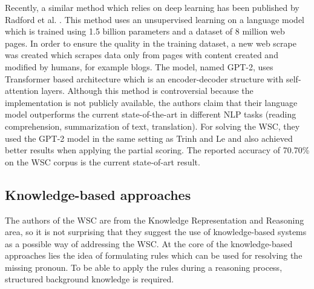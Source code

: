 Recently, a similar method which relies on deep learning has been published by Radford et al. \cite{radford2019language}. This method uses an unsupervised learning on a language model which is trained using 1.5 billion parameters and a dataset of 8 million web pages. In order to ensure the quality in the training dataset, a new web scrape was created which scrapes data only from pages with content created and modified by humans, for example blogs. The model, named GPT-2, uses Transformer based architecture \cite{DBLP:conf/nips/VaswaniSPUJGKP17} which is an encoder-decoder structure with self-attention layers. 
Although this method is controversial because the implementation is not publicly available, the authors claim that their language model outperforms the current state-of-the-art in different NLP tasks (reading comprehension, summarization of text, translation). For solving the WSC, they used the GPT-2 model in the same setting as Trinh and Le \cite{DBLP:journals/corr/abs-1806-02847} and also achieved better results when applying the partial scoring. The reported accuracy of 70.70\% on the WSC corpus is the current state-of-art result. 


\subsection{Knowledge-based approaches}
The authors of the WSC are from the Knowledge Representation and Reasoning area, so it is not surprising that they suggest the use of knowledge-based systems as a possible way of addressing the WSC. At the core of the knowledge-based approaches lies the idea of formulating rules which can be used for resolving the missing pronoun. To be able to apply the rules during a reasoning process, structured background knowledge is required.


